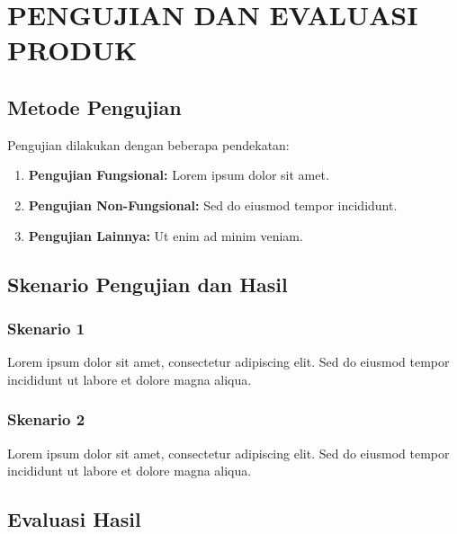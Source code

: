 \chapter{PENGUJIAN DAN EVALUASI PRODUK}

\section{Metode Pengujian}


Pengujian dilakukan dengan beberapa pendekatan:

\begin{enumerate}
    \item \textbf{Pengujian Fungsional:} Lorem ipsum dolor sit amet.
    \item \textbf{Pengujian Non-Fungsional:} Sed do eiusmod tempor incididunt.
    \item \textbf{Pengujian Lainnya:} Ut enim ad minim veniam.
\end{enumerate}

\section{Skenario Pengujian dan Hasil}

\subsection{Skenario 1}


Lorem ipsum dolor sit amet, consectetur adipiscing elit. Sed do eiusmod tempor incididunt ut labore et dolore magna aliqua.

\subsection{Skenario 2}


Lorem ipsum dolor sit amet, consectetur adipiscing elit. Sed do eiusmod tempor incididunt ut labore et dolore magna aliqua.

\section{Evaluasi Hasil}


